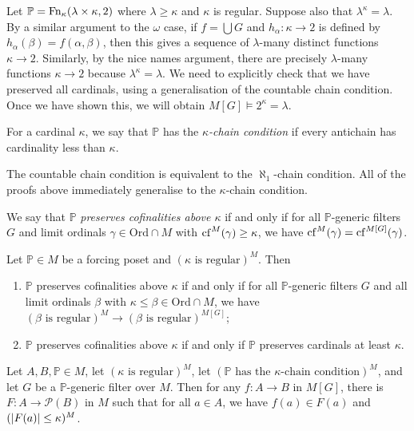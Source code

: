 Let \( \mathbb P = \operatorname{Fn}_\kappa(\lambda \times \kappa, 2) \) where \( \lambda \geq \kappa \) and \( \kappa \) is regular.
Suppose also that \( \lambda^\kappa = \lambda \).
By a similar argument to the \( \omega \) case, if \( f = \bigcup G \) and \( h_\alpha : \kappa \to 2 \) is defined by \( h_\alpha(\beta) = f(\alpha, \beta) \), then this gives a sequence of \( \lambda \)-many distinct functions \( \kappa \to 2 \).
Similarly, by the nice names argument, there are precisely \( \lambda \)-many functions \( \kappa \to 2 \) because \( \lambda^\kappa = \lambda \).
We need to explicitly check that we have preserved all cardinals, using a generalisation of the countable chain condition.
Once we have shown this, we will obtain \( M[G] \vDash 2^\kappa = \lambda \).
\begin{definition}
    For a cardinal \( \kappa \), we say that \( \mathbb P \) has the \emph{\( \kappa \)-chain condition} if every antichain has cardinality less than \( \kappa \).
\end{definition}
The countable chain condition is equivalent to the \( \aleph_1 \)-chain condition.
All of the proofs above immediately generalise to the \( \kappa \)-chain condition.
\begin{definition}
    We say that \( \mathbb P \) \emph{preserves cofinalities above \( \kappa \)} if and only if for all \( \mathbb P \)-generic filters \( G \) and limit ordinals \( \gamma \in \mathrm{Ord} \cap M \) with \( \operatorname{cf}^M(\gamma) \geq \kappa \), we have \( \operatorname{cf}^M(\gamma) = \operatorname{cf}^{M[G]}(\gamma) \).
\end{definition}
\begin{lemma}
    Let \( \mathbb P \in M \) be a forcing poset and \( (\kappa \text{ is regular})^M \).
    Then
    \begin{enumerate}
        \item \( \mathbb P \) preserves cofinalities above \( \kappa \) if and only if for all \( \mathbb P \)-generic filters \( G \) and all limit ordinals \( \beta \) with \( \kappa \leq \beta \in \mathrm{Ord} \cap M \), we have \( (\beta \text{ is regular})^M \to (\beta \text{ is regular})^{M[G]} \);
        \item \( \mathbb P \) preserves cofinalities above \( \kappa \) if and only if \( \mathbb P \) preserves cardinals at least \( \kappa \).
    \end{enumerate}
\end{lemma}
\begin{lemma}
    Let \( A, B, \mathbb P \in M \), let \( (\kappa \text{ is regular})^M \), let \( (\mathbb P \text{ has the } \kappa \text{-chain condition})^M \), and let \( G \) be a \( \mathbb P \)-generic filter over \( M \).
    Then for any \( f : A \to B \) in \( M[G] \), there is \( F : A \to \mathcal P(B) \) in \( M \) such that for all \( a \in A \), we have \( f(a) \in F(a) \) and \( (\abs{F(a)} \leq \kappa)^M \).
\end{lemma}
